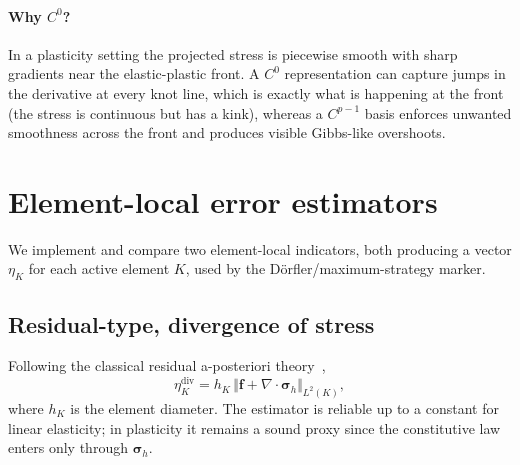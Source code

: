 \documentclass[11pt,a4paper]{article}
\newcommand{\bsigma}{\boldsymbol{\sigma}}
\newcommand{\bff}{\mathbf{f}}
\newcommand{\divg}{\nabla \cdot}
\newcommand{\Lto}{L^2}
\begin{document}
\paragraph{Why $C^0$?}  In a plasticity setting the projected stress is
piecewise smooth with sharp gradients near the elastic-plastic front.
A $C^0$ representation can capture jumps in the derivative at every knot
line, which is exactly what is happening at the front (the stress is
continuous but has a kink), whereas a $C^{p-1}$ basis enforces unwanted
smoothness across the front and produces visible Gibbs-like overshoots.

\section{Element-local error estimators}\label{sec:estimators}

We implement and compare two element-local indicators, both producing a
vector $\eta_K$ for each active element $K$, used by the
D\"orfler/maximum-strategy marker.

\subsection{Residual-type, divergence of stress}\label{sec:est:divsig}

Following the classical residual a-posteriori theory~\cite{Verfurth1996},
\begin{equation}
    \eta_K^{\mathrm{div}}
    = h_K\,\bigl\Vert \bff + \divg\bsigma_h \bigr\Vert_{\Lto(K)},
\label{eq:div_estimator}
\end{equation}
where $h_K$ is the element diameter.  The estimator is reliable up to a
constant for linear elasticity; in plasticity it remains a sound proxy
since the constitutive law enters only through $\bsigma_h$.
\end{document}
